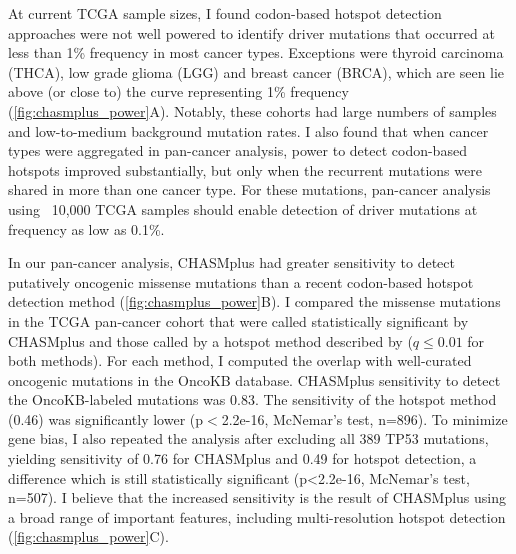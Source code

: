 At current TCGA sample sizes, I found codon-based hotspot detection approaches were not well powered to identify driver mutations that occurred at less than 1\% frequency in most cancer types.  Exceptions were thyroid carcinoma (THCA), low grade glioma (LGG) and breast cancer (BRCA), which are seen lie above (or close to) the curve representing 1\% frequency (\autoref{fig:chasmplus_power}A).  Notably, these cohorts had large numbers of samples and low-to-medium background mutation rates.  I also found that when cancer types were aggregated in pan-cancer analysis, power to detect codon-based hotspots improved substantially, but only when the recurrent mutations were shared in more than one cancer type.  For these mutations, pan-cancer analysis using ~10,000 TCGA samples should enable detection of driver mutations at frequency as low as 0.1\%.   

In our pan-cancer analysis, CHASMplus had greater sensitivity to detect putatively oncogenic missense mutations than a recent codon-based hotspot detection method (\autoref{fig:chasmplus_power}B). I compared the missense mutations in the TCGA pan-cancer cohort that were called statistically significant by CHASMplus and those called by a hotspot method described by \cite{RN23} ($q\leq 0.01$ for both methods).  For each method, I computed the overlap with well-curated oncogenic mutations in the OncoKB database.  CHASMplus sensitivity to detect the OncoKB-labeled mutations was 0.83.  The sensitivity of the hotspot method (0.46) was significantly lower (p$<$2.2e-16, McNemar's test, n=896).  To minimize gene bias, I also repeated the analysis after excluding all 389 TP53 mutations, yielding sensitivity of 0.76 for CHASMplus and 0.49 for hotspot detection, a difference which is still statistically significant (p<2.2e-16, McNemar's test, n=507).  I believe that the increased sensitivity is the result of CHASMplus using a broad range of important features, including multi-resolution hotspot detection (\autoref{fig:chasmplus_power}C).

